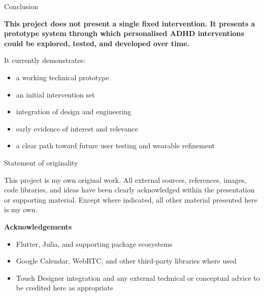 \documentclass[aspectratio=169,10pt]{beamer}
\begin{document}
\begin{frame}{Conclusion}
\hspace{0.7cm}
\begin{minipage}{0.85\textwidth}
{\fontsize{18}{24}\selectfont\bfseries
This project does not present a single fixed intervention. It presents a prototype system through which personalised ADHD interventions could be explored, tested, and developed over time.}

\vspace{0.6cm}

It currently demonstrates:
\begin{itemize}
    \item a working technical prototype
    \item an initial intervention set
    \item integration of design and engineering
    \item early evidence of interest and relevance
    \item a clear path toward future user testing and wearable refinement
\end{itemize}
\end{minipage}
\end{frame}

\begin{frame}{Statement of originality}
\hspace{0.7cm}
\begin{minipage}{0.88\textwidth}
\small
This project is my own original work. All external sources, references, images, code libraries, and ideas have been clearly acknowledged within the presentation or supporting material. Except where indicated, all other material presented here is my own.

\vspace{0.55cm}

\textbf{Acknowledgements}
\begin{itemize}
    \item Flutter, Julia, and supporting package ecosystems
    \item Google Calendar, WebRTC, and other third-party libraries where used
    \item Touch Designer integration and any external technical or conceptual advice to be credited here as appropriate
\end{itemize}
\end{minipage}
\end{frame}
\end{document}

